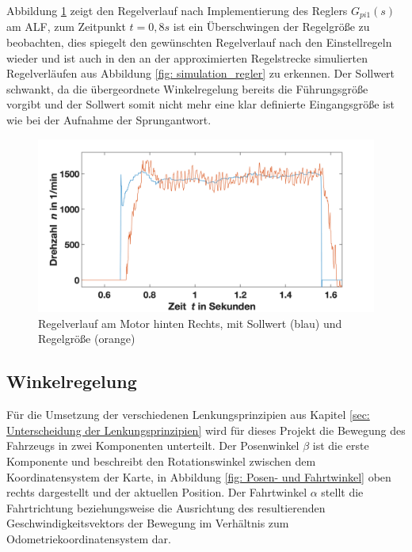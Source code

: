 			Abbildung \ref{fig: regler_real} zeigt den Regelverlauf nach Implementierung des Reglers $G_{pi1}(s)$ am ALF, zum Zeitpunkt $t=0,8\si{s}$ ist ein Überschwingen der Regelgröße zu beobachten, dies spiegelt den gewünschten Regelverlauf nach den Einstellregeln wieder und ist auch in den an der approximierten Regelstrecke simulierten Regelverläufen aus Abbildung \ref{fig: simulation_regler} zu erkennen. Der Sollwert schwankt, da die übergeordnete Winkelregelung bereits die Führungsgröße vorgibt und der Sollwert somit nicht mehr eine klar definierte Eingangsgröße ist wie bei der Aufnahme der Sprungantwort.
			
			
				\begin{figure}[H]
					\centering
					\includegraphics[width=1.0\textwidth]{Bilder/regler_real.png}
					\caption{Regelverlauf am Motor hinten Rechts, mit Sollwert (blau) und Regelgröße (orange)}
					\label{fig: regler_real}
				\end{figure} 

		
		
		\subsection{Winkelregelung}
			\label{subsec: Winkelregelung}
		
		
		Für die Umsetzung der verschiedenen Lenkungsprinzipien aus Kapitel \ref{sec: Unterscheidung der Lenkungsprinzipien} wird für dieses Projekt die Bewegung des Fahrzeugs in zwei Komponenten unterteilt. Der Posenwinkel $\beta$ ist die erste Komponente und beschreibt den Rotationswinkel zwischen dem Koordinatensystem der Karte, in Abbildung \ref{fig: Posen- und Fahrtwinkel} oben rechts dargestellt und der aktuellen Position. Der Fahrtwinkel $\alpha$ stellt die Fahrtrichtung beziehungsweise die Ausrichtung des resultierenden Geschwindigkeitsvektors der Bewegung im Verhältnis zum Odometriekoordinatensystem dar. 
		
